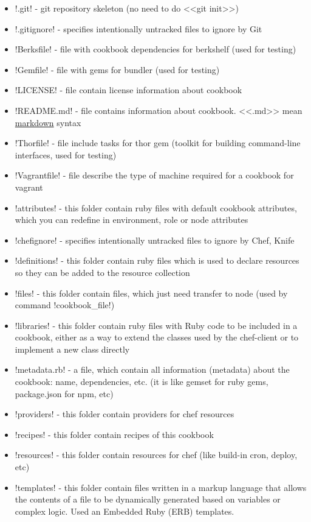 \begin{itemize}
  \item \inline!.git! - git repository skeleton (no need to do <<git init>>)
  \item \inline!.gitignore! - specifies intentionally untracked files to ignore by Git
  \item \inline!Berksfile! - file with cookbook dependencies for berkshelf (used for testing)
  \item \inline!Gemfile! - file with gems for bundler (used for testing)
  \item \inline!LICENSE! - file contain license information about cookbook
  \item \inline!README.md! - file contains information about cookbook. <<.md>> mean \href{http://daringfireball.net/projects/markdown/syntax}{markdown} syntax
  \item \inline!Thorfile! - file include tasks for thor gem (toolkit for building command-line interfaces, used for testing)
  \item \inline!Vagrantfile! - file describe the type of machine required for a cookbook for vagrant
  \item \inline!attributes! - this folder contain ruby files with default cookbook attributes, which you can redefine in environment, role or node attributes
  \item \inline!chefignore! - specifies intentionally untracked files to ignore by Chef, Knife
  \item \inline!definitions! - this folder contain ruby files which is used to declare resources so they can be added to the resource collection
  \item \inline!files! - this folder contain files, which just need transfer to node (used by command \inline!cookbook_file!)
  \item \inline!libraries! - this folder contain ruby files with Ruby code to be included in a cookbook, either as a way to extend the classes used by the chef-client or to implement a new class directly
  \item \inline!metadata.rb! - a file, which contain all information (metadata) about the cookbook: name, dependencies, etc. (it is like gemset for ruby gems, package.json for npm, etc)
  \item \inline!providers! - this folder contain providers for chef resources
  \item \inline!recipes! - this folder contain recipes of this cookbook
  \item \inline!resources! - this folder contain resources for chef (like build-in cron, deploy, etc)
  \item \inline!templates! - this folder contain files written in a markup language that allows the contents of a file to be dynamically generated based on variables or complex logic. Used an Embedded Ruby (ERB) templates.
\end{itemize}
